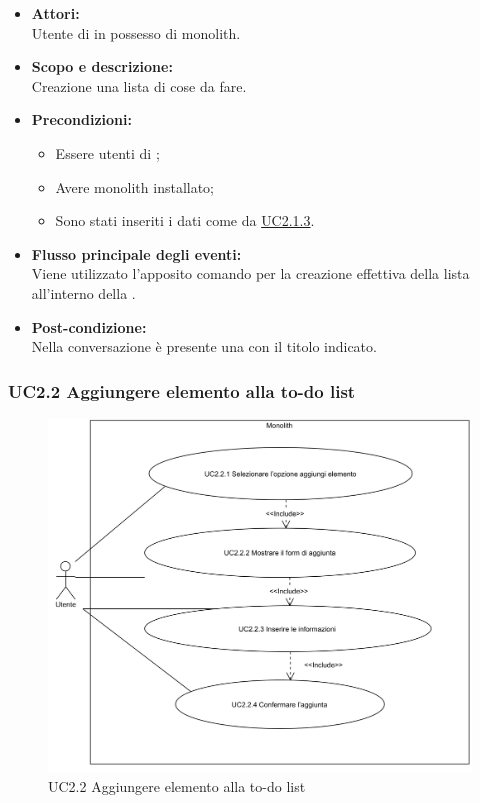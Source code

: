 \begin{itemize}
	\item \textbf{Attori:}
	\\Utente di  in possesso di monolith.
	\item \textbf{Scopo e descrizione:} 
	\\Creazione una lista di cose da fare.
	\item \textbf{Precondizioni:}
	\begin{itemize}
		\item Essere utenti di ;
		\item Avere monolith installato;
		\item Sono stati inseriti i dati come da \hyperref[UC2.1.3]{UC2.1.3}.
	\end{itemize}
	\item \textbf{Flusso principale degli eventi:}
	\\Viene utilizzato l'apposito comando per la creazione effettiva della lista all'interno della .
	\item \textbf{Post-condizione:}
	\\Nella conversazione è presente una   con il titolo indicato. 
\end{itemize}

\subsubsection{UC2.2 Aggiungere elemento alla to-do list} \label{UC2.2}

\begin{figure}[H]
	\centering
	\includegraphics[width=15cm]{../../documenti/AnalisiDeiRequisiti/Diagrammi_img/uc2_2.png}
	\caption{UC2.2 Aggiungere elemento alla to-do list}
\end{figure}

